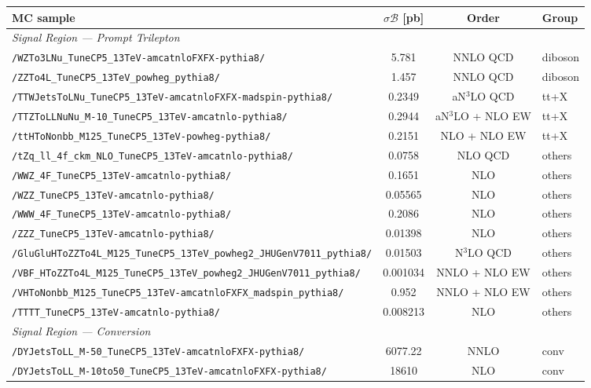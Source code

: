 \begin{table}
  \centering
  \footnotesize
  \begin{tabular}{lccl}
  \hline\hline
  \textbf{MC sample} & \textbf{$\sigma\mathcal{B}$ [pb]} & \textbf{Order} & \textbf{Group} \\
  \hline
  \multicolumn{4}{l}{\textit{Signal Region — Prompt Trilepton}} \\
  \texttt{/WZTo3LNu\_TuneCP5\_13TeV-amcatnloFXFX-pythia8/} & 5.781 & NNLO QCD & diboson \\
  \texttt{/ZZTo4L\_TuneCP5\_13TeV\_powheg\_pythia8/} & 1.457 & NNLO QCD & diboson \\
  \texttt{/TTWJetsToLNu\_TuneCP5\_13TeV-amcatnloFXFX-madspin-pythia8/} & 0.2349 & aN$^{3}$LO QCD & tt+X \\
  \texttt{/TTZToLLNuNu\_M-10\_TuneCP5\_13TeV-amcatnlo-pythia8/} & 0.2944 & aN$^{3}$LO + NLO EW & tt+X \\
  \texttt{/ttHToNonbb\_M125\_TuneCP5\_13TeV-powheg-pythia8/} & 0.2151 & NLO + NLO EW & tt+X \\
  \texttt{/tZq\_ll\_4f\_ckm\_NLO\_TuneCP5\_13TeV-amcatnlo-pythia8/} & 0.0758 & NLO QCD & others \\
  \texttt{/WWZ\_4F\_TuneCP5\_13TeV-amcatnlo-pythia8/} & 0.1651 & NLO & others \\
  \texttt{/WZZ\_TuneCP5\_13TeV-amcatnlo-pythia8/} & 0.05565 & NLO & others \\
  \texttt{/WWW\_4F\_TuneCP5\_13TeV-amcatnlo-pythia8/} & 0.2086 & NLO & others \\
  \texttt{/ZZZ\_TuneCP5\_13TeV-amcatnlo-pythia8/} & 0.01398 & NLO & others \\
  \texttt{/GluGluHToZZTo4L\_M125\_TuneCP5\_13TeV\_powheg2\_JHUGenV7011\_pythia8/} & 0.01503 & N$^{3}$LO QCD & others \\
  \texttt{/VBF\_HToZZTo4L\_M125\_TuneCP5\_13TeV\_powheg2\_JHUGenV7011\_pythia8/} & 0.001034 & NNLO + NLO EW & others \\
  \texttt{/VHToNonbb\_M125\_TuneCP5\_13TeV-amcatnloFXFX\_madspin\_pythia8/} & 0.952 & NNLO + NLO EW & others \\
  \texttt{/TTTT\_TuneCP5\_13TeV-amcatnlo-pythia8/} & 0.008213 & NLO & others \\
  \hline
  \multicolumn{4}{l}{\textit{Signal Region — Conversion}} \\
  \texttt{/DYJetsToLL\_M-50\_TuneCP5\_13TeV-amcatnloFXFX-pythia8/} & 6077.22 & NNLO & conv \\
  \texttt{/DYJetsToLL\_M-10to50\_TuneCP5\_13TeV-amcatnloFXFX-pythia8/} & 18610 & NLO & conv \\

\end{tabular}
\end{table}
